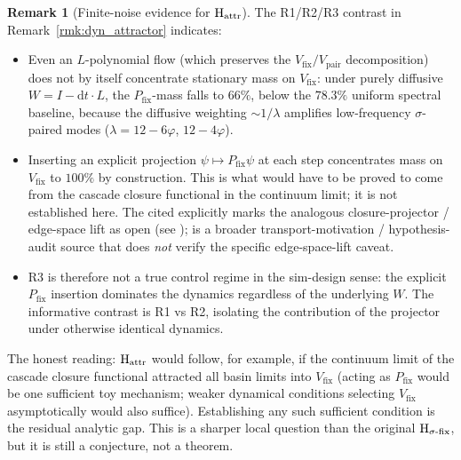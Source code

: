 \documentclass[11pt, a4paper]{amsart}
\theoremstyle{definition}
\newtheorem{remark}[theorem]{Remark}
\begin{document}
\begin{remark}[Finite-noise evidence for $\textup{H}_{\mathrm{attr}}$]\label{rmk:H_attr_evidence}
The R1/R2/R3 contrast in Remark~\ref{rmk:dyn_attractor} indicates:
\begin{itemize}
\item Even an $L$-polynomial flow (which preserves the
$V_{\mathrm{fix}}/V_{\mathrm{pair}}$ decomposition) does not by
itself concentrate stationary mass on $V_{\mathrm{fix}}$: under
purely diffusive $W = I - \mathrm{d}t \cdot L$, the
$P_{\mathrm{fix}}$-mass falls to $66\%$, below the $78.3\%$
uniform spectral baseline, because the diffusive weighting
$\sim 1/\lambda$ amplifies low-frequency $\sigma$-paired modes
($\lambda = 12-6\varphi$, $12-4\varphi$).
\item Inserting an explicit projection $\psi \mapsto P_{\mathrm{fix}}\psi$
at each step concentrates mass on $V_{\mathrm{fix}}$ to $100\%$ by
construction.  This is what would have to be proved to come from
the cascade closure functional in the continuum limit; it is not
established here.  The cited
\cite{AdaptiveClosureTransport} explicitly marks the analogous
closure-projector / edge-space lift as open
(see \cite[lines 327--328, 377--382]{AdaptiveClosureTransport});
\cite{TransportLaw} is a broader transport-motivation /
hypothesis-audit source that does \emph{not} verify the specific
edge-space-lift caveat.
\item R3 is therefore not a true control regime in the
sim-design sense: the explicit $P_{\mathrm{fix}}$ insertion
dominates the dynamics regardless of the underlying $W$.  The
informative contrast is R1 vs R2, isolating the contribution of
the projector under otherwise identical dynamics.
\end{itemize}
The honest reading: $\textup{H}_{\mathrm{attr}}$ would follow,
for example, if the continuum limit of the cascade closure
functional attracted all basin limits into $V_{\mathrm{fix}}$
(acting as $P_{\mathrm{fix}}$ would be one sufficient toy
mechanism; weaker dynamical conditions selecting $V_{\mathrm{fix}}$
asymptotically would also suffice).  Establishing any such
sufficient condition is the residual analytic gap.  This is a
sharper local question than the original
$\textup{H}_{\sigma\text{-fix}}$, but it is still a conjecture,
not a theorem.
\end{remark}
\end{document}
